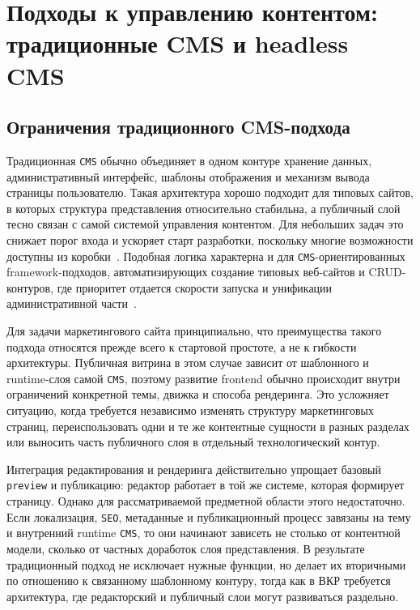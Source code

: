 \section{Подходы к управлению контентом: традиционные CMS и headless CMS}

\subsection{Ограничения традиционного CMS-подхода}

Традиционная \texttt{CMS} обычно объединяет в одном контуре хранение данных, административный
интерфейс, шаблоны отображения и механизм вывода страницы пользователю. Такая архитектура
хорошо подходит для типовых сайтов, в которых структура представления относительно стабильна,
а публичный слой тесно связан с самой системой управления контентом. Для небольших задач это
снижает порог входа и ускоряет старт разработки, поскольку многие возможности доступны из
коробки~\cite{yesikov2013cms-comparative-analysis}.
Подобная логика характерна и для \texttt{CMS}-ориентированных framework-подходов,
автоматизирующих создание типовых веб-сайтов и CRUD-контуров, где приоритет отдается
скорости запуска и унификации административной части~\cite{bandirmali2018mtcmf}.

Для задачи маркетингового сайта принципиально, что преимущества такого подхода относятся
прежде всего к стартовой простоте, а не к гибкости архитектуры. Публичная витрина в этом
случае зависит от шаблонного и runtime-слоя самой \texttt{CMS}, поэтому развитие frontend
обычно происходит внутри ограничений конкретной темы, движка и способа рендеринга. Это
усложняет ситуацию, когда требуется независимо изменять структуру маркетинговых страниц,
переиспользовать одни и те же контентные сущности в разных разделах или выносить часть
публичного слоя в отдельный технологический контур.

Интеграция редактирования и рендеринга действительно упрощает базовый \texttt{preview} и
публикацию: редактор работает в той же системе, которая формирует страницу. Однако для
рассматриваемой предметной области этого недостаточно. Если локализация, \texttt{SEO},
метаданные и публикационный процесс завязаны на тему и внутренний runtime \texttt{CMS},
то они начинают зависеть не столько от контентной модели, сколько от частных доработок
слоя представления. В результате традиционный подход не исключает нужные функции, но
делает их вторичными по отношению к связанному шаблонному контуру, тогда как в ВКР
требуется архитектура, где редакторский и публичный слои могут развиваться раздельно.

